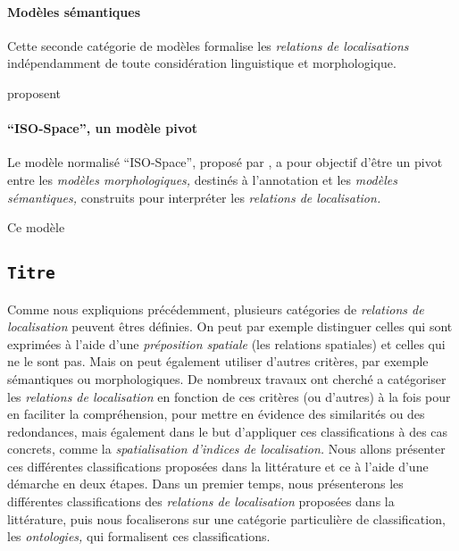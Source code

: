 \paragraph{Modèles sémantiques}

Cette seconde catégorie de modèles formalise les \emph{relations de
  localisations} indépendamment de toute considération linguistique
et morphologique.

\textcite{Aurngague1997} proposent

\autocite{Bateman2010}

\paragraph{\enquote{ISO-Space}, un modèle pivot}

Le modèle normalisé \enquote{ISO-Space}, proposé par
\textcite{Pustejovsky2017}, a pour objectif d'être un pivot entre les
\emph{modèles morphologiques,} destinés à l'annotation et les
\emph{modèles sémantiques,} construits pour interpréter les
\emph{relations de localisation.}

Ce modèle 


\subsection{\texttt{Titre}}

Comme nous expliquions précédemment, plusieurs catégories de
\emph{relations de localisation} peuvent êtres définies. On peut par
exemple distinguer celles qui sont exprimées à l'aide d'une
\emph{préposition spatiale} (\ie les relations spatiales) et celles
qui ne le sont pas. Mais on peut également utiliser d'autres critères,
par exemple sémantiques ou morphologiques. De nombreux travaux ont
cherché a catégoriser les \emph{relations de localisation} en fonction
de ces critères (ou d'autres) à la fois pour en faciliter la
compréhension, pour mettre en évidence des similarités ou des
redondances, mais également dans le but d'appliquer ces
classifications à des cas concrets, comme la \emph{spatialisation
  d'indices de localisation.} Nous allons présenter ces différentes
classifications proposées dans la littérature et ce à l'aide d'une
démarche en deux étapes. Dans un premier temps, nous présenterons les
différentes classifications des \emph{relations de localisation}
proposées dans la littérature, puis nous focaliserons sur une
catégorie particulière de classification, les \emph{ontologies,} qui
formalisent ces classifications.

